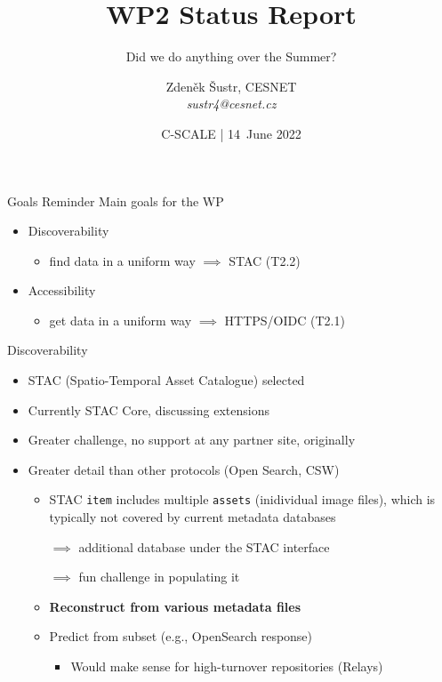 \documentclass[c,aspectratio=169,14pt]{beamer}
\begin{document}
\title{WP2 Status Report}
\subtitle{Did we do anything over the Summer?}
\author{Zdeněk Šustr, CESNET\\\textit{sustr4@cesnet.cz}}
\date{C-SCALE | 14~June 2022}

\begin{frame}[plain]
\vspace{8ex}
\maketitle
\end{frame}


\begin{frame}{Goals Reminder}
Main goals for the WP
\begin{itemize}
\item \alert{Discoverability}
\begin{itemize}
\item \alert{find} data in a uniform way $\implies$ STAC (T2.2)
\end{itemize}
\item \alert{Accessibility}
\begin{itemize}
\item \alert{get} data in a uniform way $\implies$ HTTPS/OIDC (T2.1)
\end{itemize}
\end{itemize}

\end{frame}

\begin{frame}{Discoverability}

\begin{itemize}
\item \alert{STAC} (Spatio-Temporal Asset Catalogue) selected
\item Currently \alert{STAC Core}, discussing extensions
\item Greater challenge, no support at any partner site, originally
\item Greater detail than other protocols (Open Search, CSW)
\begin{itemize}
\item STAC \texttt{item} includes multiple \texttt{assets} (inidividual image files), which is typically not covered by current metadata databases

\smallskip
\item[$\implies$] additional database under the STAC interface
\item[$\implies$] \alert{fun challenge} in populating it
\item \textbf{Reconstruct from various metadata files}
\item Predict from subset (e.g., OpenSearch response)
\begin{itemize}
\item Would make sense for high-turnover repositories (Relays)
\end{itemize}
\end{itemize}
\end{itemize}

\end{frame}
\end{document}
